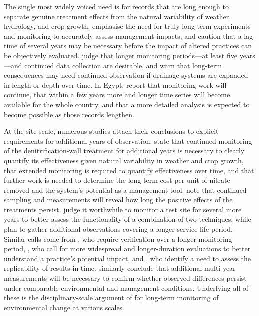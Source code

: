 The single most widely voiced need is for records that are long enough to separate genuine treatment effects from the natural variability of weather, hydrology, and crop growth. \textcite{Clifford2023} emphasise the need for truly long-term experiments and monitoring to accurately assess management impacts, and \textcite{BUHLER1993} caution that a lag time of several years may be necessary before the impact of altered practices can be objectively evaluated. \textcite{Ali2013} judge that longer monitoring periods---at least five years---and continued data collection are desirable, and warn that long-term consequences may need continued observation if drainage systems are expanded in length or depth over time. In Egypt, \textcite{Ali2001} report that monitoring work will continue, that within a few years more and longer time series will become available for the whole country, and that a more detailed analysis is expected to become possible as those records lengthen.

At the site scale, numerous studies attach their conclusions to explicit requirements for additional years of observation. \textcite{Jaynes2008} state that continued monitoring of the denitrification-wall treatment for additional years is necessary to clearly quantify its effectiveness given natural variability in weather and crop growth, that extended monitoring is required to quantify effectiveness over time, and that further work is needed to determine the long-term cost per unit of nitrate removed and the system's potential as a management tool. \textcite{Dalhem2019} note that continued sampling and measurements will reveal how long the positive effects of the treatments persist. \textcite{Osterholm2005} judge it worthwhile to monitor a test site for several more years to better assess the functionality of a combination of two techniques, while \textcite{ROLLIN1987} plan to gather additional observations covering a longer service-life period. Similar calls come from \textcite{Wesström2015}, who require verification over a longer monitoring period, \textcite{Reinhart2020}, who call for more widespread and longer-duration evaluations to better understand a practice's potential impact, and \textcite{Rijal2012}, who identify a need to assess the replicability of results in time. \textcite{GiménezValero2025} similarly conclude that additional multi-year measurements will be necessary to confirm whether observed differences persist under comparable environmental and management conditions. Underlying all of these is the disciplinary-scale argument of \textcite{SPALING1995} for long-term monitoring of environmental change at various scales.

